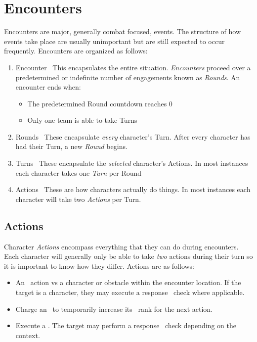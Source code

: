 \chapter{Encounters}\label{ch:encounter}
Encounters are major, generally combat focused, events. The structure of how events take place are usually unimportant but are still expected to occur frequently. Encounters are organized as follows:
\begin{enumerate}
	\item {\large Encounter} \linebreak\
	This encapsulates the entire situation. \emph{Encounters} proceed over a predetermined or indefinite number of engagements known as \emph{Rounds}. An encounter ends when: 
	\begin{itemize}
		\item The predetermined Round countdown reaches 0
		\item Only one team is able to take Turns
	\end{itemize}
\item {\large Rounds} \linebreak\
	These encapsulate \emph{every} character's Turn. After every character has had their Turn, a new \emph{Round} begins.
\item {\large Turns}\index{Turn} \linebreak\
	These encapsulate the \emph{selected} character's Actions. In most instances each character takes one \emph{Turn} per Round
\item {\large Actions}\index{Action} \linebreak\
	These are how characters actually do things. In most instances each character will take two \emph{Actions} per Turn.
\end{enumerate}

\section{Actions}\label{sec:actions}
Character \emph{Actions} encompass everything that they can do during encounters. Each character will generally only be able to take \emph{two} actions during their turn so it is important to know how they differ. Actions are as follows:
\begin{itemize}
	\item An \attribute\ action vs a character or obstacle within the encounter location. If the target is a character, they may execute a response \attribute\ check where applicable.
	\item Charge an \attribute\ to temporarily increase its \BURST\ rank for the next action.
	\item Execute a \techn\footnoteref{sec:techniques}. The target may perform a response \attribute\ check depending on the context.
\end{itemize}